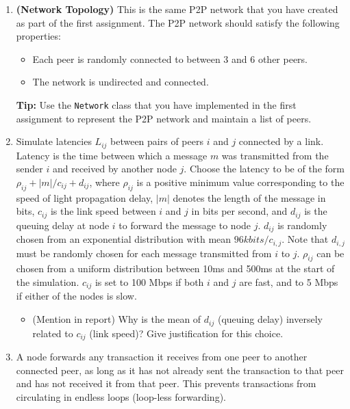 \documentclass[12pt]{extarticle}
\begin{document}
\begin{enumerate}
    \item \textbf{(Network Topology)} This is the same P2P network that you have created as part of the first assignment. The P2P network should satisfy the following properties:
          \begin{itemize}
              \item Each peer is randomly connected to between 3 and 6 other peers.
              \item The network is undirected and connected.
          \end{itemize}
          \textbf{Tip:} Use the \texttt{Network} class that you have implemented in the first assignment to represent the P2P network and maintain a list of peers.
    \item Simulate latencies $L_{ij}$ between pairs of peers $i$ and $j$ connected by a link. Latency is the time between which a message $m$ was transmitted from the sender $i$ and received by another node $j$. Choose the latency to be of the form $\rho_{ij} + |m|/c_{ij} + d_{ij}$, where $\rho_{ij}$ is a positive minimum value corresponding to the speed of light propagation delay, $|m|$ denotes the length of the message in bits, $c_{ij}$ is the link speed between $i$ and $j$ in bits per second, and $d_{ij}$ is the queuing delay at node $i$ to forward the message to node $j$. $d_{ij}$ is randomly chosen from an exponential distribution with mean $96kbits/c_{i,j}$. Note that $d_{i,j}$ must be randomly chosen for each message transmitted from $i$ to $j$. $\rho_{ij}$ can be chosen from a uniform distribution between 10ms and 500ms at the start of the simulation. $c_{ij}$ is set to 100 Mbps if both $i$ and $j$ are fast, and to 5 Mbps if either of the nodes is slow.
          \begin{itemize}
              \item (Mention in report) Why is the mean of $d_{ij}$ (queuing delay) inversely related to $c_{ij}$ (link speed)? Give justification for this choice.
          \end{itemize}

    \item A node forwards any transaction it receives from one peer to another connected peer, as long as it has not already sent the transaction to that peer and has not received it from that peer. This prevents transactions from circulating in endless loops (loop-less forwarding).
\end{enumerate}

\hrulefill
\end{document}
